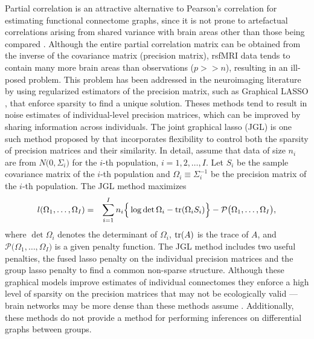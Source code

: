 \documentclass[useAMS,usenatbib,referee]{bio}
\begin{document}
Partial correlation is an attractive alternative to Pearson's correlation for estimating functional connectome graphs, since it is not prone to artefactual correlations arising from shared variance with brain areas other than those being compared \citep{Varoquaux2013}. Although the entire partial correlation matrix can be obtained from the inverse of the covariance matrix (precision matrix), rsfMRI data tends to contain many more brain areas than observations ($p >> n$), resulting in an ill-posed problem. This problem has been addressed in the neuroimaging literature by using regularized estimators of the precision matrix, such as Graphical LASSO \citep{Meinshausen:2006,Yuan:2007,Rothman:2008}, that enforce sparsity to find a unique solution.  Theses methods tend to result in noise estimates of individual-level precision matrices, which can be improved by sharing information across individuals. The joint graphical lasso (JGL) is one such method proposed by \citet{Danaher:2014} that incorporates flexibility to control both the sparsity of precision matrices and their similarity. In detail, assume that data of size $n_i$ are from $N \big(0, \Sigma_i\big)$ for the $i$-th population, $i=1,2,\ldots, I$. Let $S_i$ be the sample covariance matrix of the $i$-th population and $\Omega_i\equiv \Sigma_i^{-1}$ be the precision matrix of the $i$-th population. The JGL method maximizes
\begin{eqnarray*}
l(\Omega_1,\ldots,\Omega_I)
&=& \sum_{i=1}^I n_i \Big\{ \log\det
\Omega_i - {\rm tr}(\Omega_i {S}_i ) \Big\}  - \mathcal{P} \big( \Omega_1,\ldots,\Omega_I \big),
\end{eqnarray*}
where $\det \Omega_i$ denotes the determinant of $\Omega_i$, ${\rm tr}(A)$ is the trace of $A$, and $\mathcal{P} \big( \Omega_1,\ldots,\Omega_I \big)$ is a given penalty function. The JGL method includes two useful penalties, the fused lasso penalty on the individual precision matrices and the group lasso penalty to find a common non-sparse structure. Although these graphical models improve estimates of individual connectomes they enforce a high level of sparsity on the precision matrices that may not be ecologically valid --- brain networks may be more dense than these methods assume \citep{Ryali2012}. Additionally, these methods do not provide a method for performing inferences on differential graphs between groups.
\end{document}
